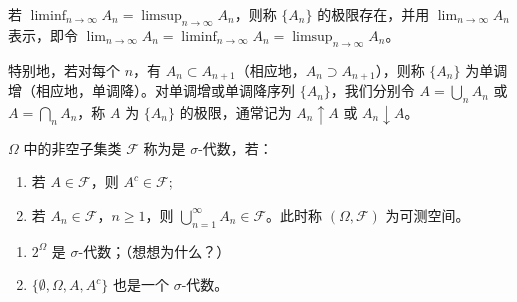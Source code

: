 \documentclass[lang=cn,10pt,thmcnt=section]{elegantbook}
\begin{document}
若 \(\liminf_{n \to \infty} A_n = \limsup_{n \to \infty} A_n\)，则称 \(\{A_n\}\) 的极限存在，并用 \(\lim_{n \to \infty} A_n\) 表示，即令 \(\lim_{n \to \infty} A_n = \liminf_{n \to \infty} A_n = \limsup_{n \to \infty} A_n\)。

特别地，若对每个 \(n\)，有 \(A_n \subset A_{n+1}\)（相应地，\(A_n \supset A_{n+1}\)），则称 \(\{A_n\}\) 为单调增（相应地，单调降）。对单调增或单调降序列 \(\{A_n\}\)，我们分别令 \(A = \bigcup_n A_n\) 或 \(A = \bigcap_n A_n\)，称 \(A\) 为 \(\{A_n\}\) 的极限，通常记为 \(A_n \uparrow A\) 或 \(A_n \downarrow A\)。

\begin{definition}[\(\sigma\)-代数]
	\(\Omega\) 中的非空子集类 \(\mathscr{F}\) 称为是 \(\sigma\)-代数，若：
\begin{enumerate}
    \item 若 \(A \in \mathscr{F}\)，则 \(A^c \in \mathscr{F}\);
    \item 若 \(A_n \in \mathscr{F}\)，\(n \geq 1\)，则 \(\bigcup_{n=1}^{\infty} A_n \in \mathscr{F}\)。此时称 \((\Omega, \mathscr{F})\) 为可测空间。
\end{enumerate}
\end{definition}

\begin{enumerate}
    \item \(2^\Omega\) 是 \(\sigma\)-代数；（想想为什么？）
    \item \(\{\emptyset, \Omega, A, A^c\}\) 也是一个 \(\sigma\)-代数。
\end{enumerate}
\end{document}
